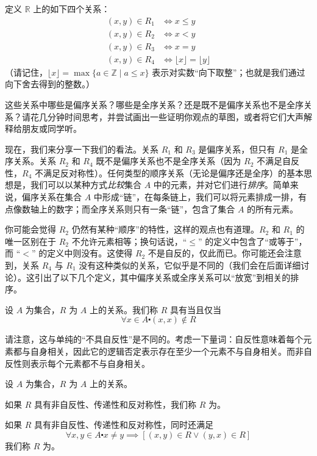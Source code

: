 \begin{example}
    定义 $\mathbb{R}$ 上的如下四个关系：
    \begin{align*}
        (x, y) \in R_1 &\iff x \le y \\
        (x, y) \in R_2 &\iff x < y \\
        (x, y) \in R_3 &\iff x = y \\
        (x, y) \in R_4 &\iff \lfloor x \rfloor = \lfloor y \rfloor
    \end{align*}
    （请记住，$\lfloor x \rfloor = \max\{a \in \mathbb{Z} \mid a \le x\}$ 表示对实数``向下取整''；也就是我们通过向下舍去得到的整数。）

    这些关系中哪些是偏序关系？哪些是全序关系？还是既不是偏序关系也不是全序关系？请花几分钟时间思考，并尝试画出一些证明你观点的草图，或者将它们大声解释给朋友或同学听。

    现在，我们来分享一下我们的看法。关系 $R_1$ 和 $R_3$ 是偏序关系，但只有 $R_1$ 是全序关系。关系 $R_2$ 和 $R_4$ 既不是偏序关系也不是全序关系（因为 $R_2$ 不满足自反性，$R_4$ 不满足反对称性）。任何类型的顺序关系（无论是偏序还是全序）的基本思想是，我们可以以某种方式\emph{比较}集合 $A$ 中的元素，并对它们进行\emph{排序}。简单来说，偏序关系在集合 $A$ 中形成``链''，在每条链上，我们可以将元素排成一排，有点像数轴上的数字；而全序关系则只有一条``链''，包含了集合 $A$ 的所有元素。
\end{example}

你可能会觉得 $R_2$ 仍然有某种``顺序''的特性，这样的观点也有道理。$R_2$ 和 $R_1$ 的唯一区别在于 $R_2$ 不允许元素相等；换句话说，``$\le$'' 的定义中包含了``或等于''，而 ``$<$'' 的定义中则没有。这使得 $R_2$ 不是自反的，仅此而已。你可能还会注意到，关系 $R_4$ 与 $R_1$ 没有这种类似的关系，它似乎是不同的（我们会在后面详细讨论）。这引出了以下几个定义，其中偏序关系或全序关系可以``放宽''到相关的排序。

\begin{definition}
    设 $A$ 为集合，$R$ 为 $A$ 上的关系。我们称 $R$ 具有当且仅当
    \[\forall x \in A \centerdot (x, x) \notin R\]
\end{definition}

请注意，这与单纯的``不具自反性''是不同的。考虑一下量词：自反性意味着每个元素都与自身相关，因此它的逻辑否定表示存在至少一个元素不与自身相关。而非自反性则表示每个元素都不与自身相关。

\begin{definition}
    设 $A$ 为集合，$R$ 为 $A$ 上的关系。
    
    如果 $R$ 具有非自反性、传递性和反对称性，我们称 $R$ 为。

    如果 $R$ 具有非自反性、传递性和反对称性，同时还满足
    \[\forall x, y \in A \centerdot x \ne y \implies [(x, y) \in R \lor (y, x) \in R]\]
    我们称 $R$ 为。
\end{definition}


